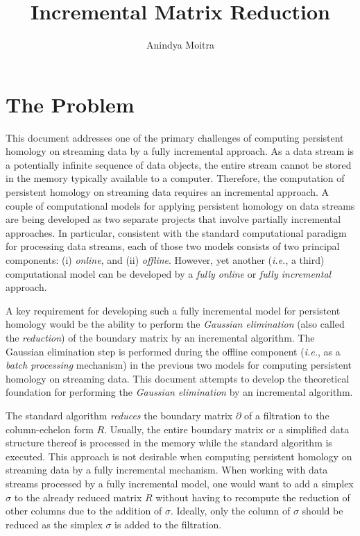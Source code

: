 \documentclass[11pt]{article}
\author{Anindya Moitra}
\title{Incremental Matrix Reduction}
\date{\vspace{-5ex}}
\begin{document}
	

\maketitle

\section{The Problem}

This document addresses one of the primary challenges of computing persistent homology on streaming 
data by a fully incremental approach.  As a data stream is a potentially infinite sequence of data 
objects, the entire stream cannot be stored in the memory typically available to a computer.  
Therefore, the computation of persistent homology on streaming data requires an incremental 
approach.  A couple of computational models for applying persistent homology on data streams are 
being developed as two separate projects that involve partially incremental approaches.  In 
particular, consistent with the standard computational paradigm \cite{silva-13} for processing 
data streams, each of those two models consists of two principal components: (i) \emph{online}, and 
(ii) \emph{offline}.  However, yet another (\emph{i.e.}, a third) computational model can be 
developed by a \emph{fully online} or \emph{fully incremental} approach.


A key requirement for developing such a fully incremental model for persistent homology would be 
the ability to perform the \emph{Gaussian elimination} (also called the \emph{reduction}) of the 
boundary matrix \cite{edelsbrunner-00, zomorodian-05} by an incremental algorithm.  The Gaussian 
elimination step is performed during the offline component (\emph{i.e.}, as a \emph{batch 
processing} mechanism) in the previous two models for computing persistent homology on streaming 
data.  This document attempts to develop the theoretical foundation for performing the 
\emph{Gaussian elimination} by an incremental algorithm.


The standard algorithm \cite{edelsbrunner-00, zomorodian-05} \emph{reduces} the boundary matrix 
$\partial$ of a filtration \cite{zomorodian-10} to the column-echelon form $R$.  Usually, the 
entire boundary matrix or a simplified data structure thereof is processed in the memory while the 
standard algorithm is executed.  This approach is not desirable when computing persistent homology 
on streaming data by a fully incremental mechanism.  When working with data streams processed by a 
fully incremental model, one would want to add a simplex $\sigma$ to the already reduced matrix $R$ 
without having to recompute the reduction of other columns due to the addition of $\sigma$.  
Ideally, only the column of $\sigma$ should be reduced as the simplex $\sigma$ is added to the 
filtration.
\end{document}

